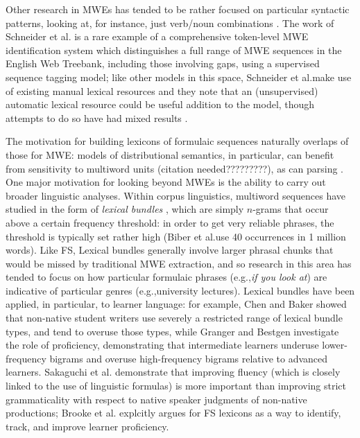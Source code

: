 \documentclass[11pt]{article}
\makeatletter
\def \eg {e.g.,\@ }
\def \al {al.\@ }
\makeatother
\begin{document}
Other research in MWEs has tended to be rather focused on particular syntactic patterns, looking at, for instance, just verb/noun combinations \cite{Fazly09}. The work of Schneider et \al {} is a rare example of a comprehensive token-level MWE identification system which distinguishes a full range of MWE sequences in the English Web Treebank, including those involving gaps, using a supervised sequence tagging model; like other models in this space, Schneider et \al make use of existing manual lexical resources and they note that an (unsupervised) automatic lexical resource could be useful addition to the model, though attempts to do so have had mixed results \cite{Riedl16}. 

The motivation for building lexicons of formulaic sequences naturally overlaps of those for MWE: models of distributional semantics, in particular, can benefit from sensitivity to multiword units (citation needed?????????), as can parsing \cite{Constant16}. One major motivation for looking beyond MWEs is the ability to carry out broader linguistic analyses. Within corpus linguistics, multiword sequences have studied in the form of \textit{lexical bundles} \cite{Biber04}, which are simply $n$-grams that occur above a certain frequency threshold: in order to get very reliable phrases, the threshold is typically set rather high (Biber et \al use 40 occurrences in 1 million words). Like FS, Lexical bundles generally involve larger phrasal chunks that would be missed by traditional MWE extraction, and so research in this area has tended to focus on how particular formulaic phrases (\eg \textit{if you look at}) are indicative of particular genres (\eg university lectures). Lexical bundles have been applied, in particular, to learner language: for example, Chen and Baker  showed that non-native student writers use severely a restricted range of lexical bundle types, and tend to overuse those types, while Granger and Bestgen  investigate the role of proficiency, demonstrating that intermediate learners underuse lower-frequency bigrams and overuse high-frequency bigrams relative to advanced learners. Sakaguchi et \al {} demonstrate that improving fluency (which is closely linked to the use of linguistic formulas) is more important than improving strict grammaticality with respect to native speaker judgments of non-native productions; Brooke et \al {} explcitly argues for FS lexicons as a way to identify, track, and improve learner proficiency.
\end{document}
